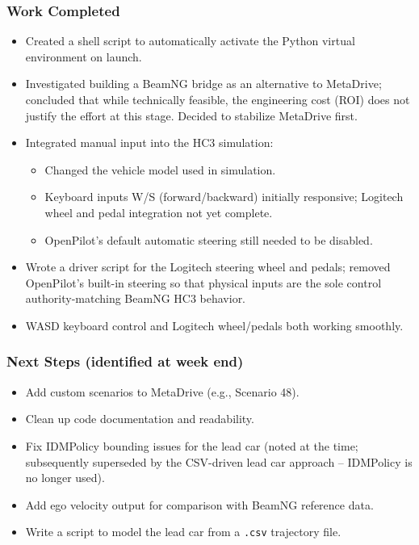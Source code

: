 \documentclass[12pt]{article}
\begin{document}
\subsubsection{Work Completed}
\begin{itemize}
  \item Created a shell script to automatically activate the Python virtual environment on launch.
  \item Investigated building a BeamNG bridge as an alternative to MetaDrive; concluded that while technically feasible, the engineering cost (ROI) does not justify the effort at this stage. Decided to stabilize MetaDrive first.
  \item Integrated manual input into the HC3 simulation:
    \begin{itemize}
      \item Changed the vehicle model used in simulation.
      \item Keyboard inputs W/S (forward/backward) initially responsive; Logitech wheel and pedal integration not yet complete.
      \item OpenPilot's default automatic steering still needed to be disabled.
    \end{itemize}
  \item Wrote a driver script for the Logitech steering wheel and pedals; removed OpenPilot's built-in steering so that physical inputs are the sole control authority-matching BeamNG HC3 behavior.
  \item WASD keyboard control and Logitech wheel/pedals both working smoothly.
\end{itemize}

\subsubsection{Next Steps (identified at week end)}
\begin{itemize}
  \item Add custom scenarios to MetaDrive (e.g., Scenario 48).
  \item Clean up code documentation and readability.
  \item Fix IDMPolicy bounding issues for the lead car (noted at the time; subsequently superseded by the CSV-driven lead car approach -- IDMPolicy is no longer used).
  \item Add ego velocity output for comparison with BeamNG reference data.
  \item Write a script to model the lead car from a \texttt{.csv} trajectory file.
\end{itemize}
\end{document}
